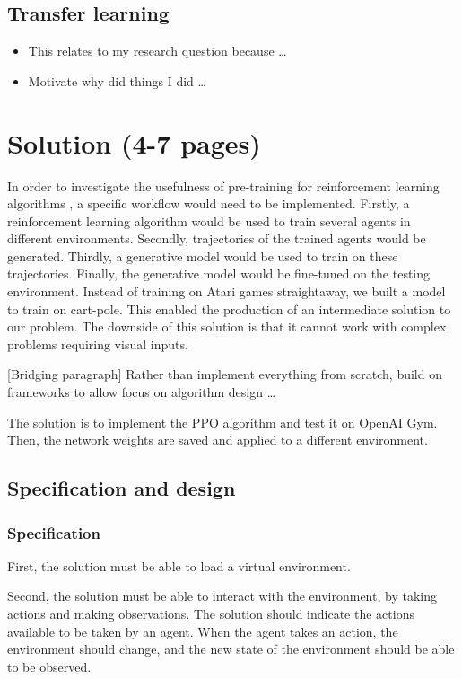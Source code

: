 \documentclass[12pt,a4paper]{article}
\begin{document}
\subsection{Transfer learning}

\begin{itemize}
    \item This relates to my research question because \dots 
    \item Motivate why did things I did \dots
\end{itemize}

\newpage
\section{Solution (4-7 pages)}
In order to investigate the usefulness of pre-training for reinforcement learning algorithms , a specific workflow would need to be implemented. Firstly, a reinforcement learning algorithm would be used to train several agents in different environments. Secondly, trajectories of the trained agents would be generated. Thirdly, a generative model would be used to train on these trajectories. Finally, the generative model would be fine-tuned on the testing environment. Instead of training on Atari games straightaway, we built a model to train on cart-pole. This enabled the production of an intermediate solution to our problem. The downside of this solution is that it cannot work with complex problems requiring visual inputs. 

[Bridging paragraph] Rather than implement everything from scratch, build on frameworks to allow focus on algorithm design \dots

The solution is to implement the PPO algorithm and test it on OpenAI Gym. Then, the network weights are saved and applied to a different environment. 

\subsection{Specification and design}
\subsubsection{Specification}
First, the solution must be able to load a virtual environment. 

Second, the solution must be able to interact with the environment, by taking actions and making observations. The solution should indicate the actions available to be taken by an agent. When the agent takes an action, the environment should change, and the new state of the environment should be able to be observed.  
\end{document}
